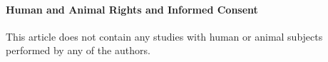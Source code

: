 \documentclass[smallextended]{svjour3}       %
\begin{document}
\hypertarget{human-and-animal-rights-and-informed-consent}{%
\paragraph{Human and Animal Rights and Informed Consent}\label{human-and-animal-rights-and-informed-consent}}

This article does not contain any studies with human or animal subjects performed by any of the authors.



\end{document}
